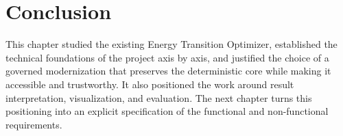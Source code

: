 \section*{Conclusion}

This chapter studied the existing Energy Transition Optimizer, established the
technical foundations of the project axis by axis, and justified the choice of a
governed modernization that preserves the deterministic core while making it
accessible and trustworthy. It also positioned the work around result
interpretation, visualization, and evaluation. The next chapter turns this
positioning into an explicit specification of the functional and non-functional
requirements.
